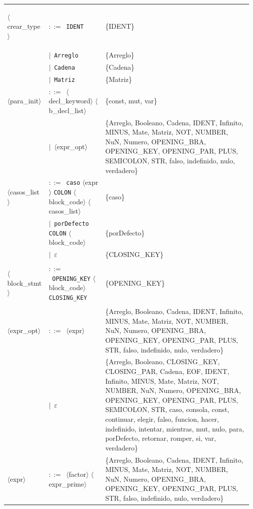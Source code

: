 \documentclass[10pt]{article}
\begin{document}
{\begin{longtable}{@{} p{2.0cm} p{6.9cm} p{6.9cm} @{}}
  \midrule
  \textcolor{ntcolor}{\parbox[t]{1.8cm}{\raggedright$\langle$crear\_\allowbreak{}type$\rangle$}} & $::=$~\texttt{IDENT} & \{IDENT\} \\
   & $\mid$~\texttt{Arreglo} & \{Arreglo\} \\
   & $\mid$~\texttt{Cadena} & \{Cadena\} \\
   & $\mid$~\texttt{Matriz} & \{Matriz\} \\
  \midrule
  \textcolor{ntcolor}{\parbox[t]{1.8cm}{\raggedright$\langle$para\_\allowbreak{}init$\rangle$}} & $::=$~$\langle$decl\_keyword$\rangle$ $\langle$b\_decl\_list$\rangle$ & \{const, mut, var\} \\
   & $\mid$~$\langle$expr\_opt$\rangle$ & \{Arreglo, Booleano, Cadena, IDENT, Infinito, MINUS, Mate, Matriz, NOT, NUMBER, NuN, Numero, OPENING\_BRA, OPENING\_KEY, OPENING\_PAR, PLUS, SEMICOLON, STR, falso, indefinido, nulo, verdadero\} \\
  \midrule
  \textcolor{ntcolor}{\parbox[t]{1.8cm}{\raggedright$\langle$casos\_\allowbreak{}list$\rangle$}} & $::=$~\texttt{caso} $\langle$expr$\rangle$ \texttt{COLON} $\langle$block\_code$\rangle$ $\langle$casos\_list$\rangle$ & \{caso\} \\
   & $\mid$~\texttt{porDefecto} \texttt{COLON} $\langle$block\_code$\rangle$ & \{porDefecto\} \\
   & $\mid$~$\varepsilon$ & \{CLOSING\_KEY\} \\
  \midrule
  \textcolor{ntcolor}{\parbox[t]{1.8cm}{\raggedright$\langle$block\_\allowbreak{}stmt$\rangle$}} & $::=$~\texttt{OPENING\_KEY} $\langle$block\_code$\rangle$ \texttt{CLOSING\_KEY} & \{OPENING\_KEY\} \\
  \midrule
  \textcolor{ntcolor}{\parbox[t]{1.8cm}{\raggedright$\langle$expr\_\allowbreak{}opt$\rangle$}} & $::=$~$\langle$expr$\rangle$ & \{Arreglo, Booleano, Cadena, IDENT, Infinito, MINUS, Mate, Matriz, NOT, NUMBER, NuN, Numero, OPENING\_BRA, OPENING\_KEY, OPENING\_PAR, PLUS, STR, falso, indefinido, nulo, verdadero\} \\
   & $\mid$~$\varepsilon$ & \{Arreglo, Booleano, CLOSING\_KEY, CLOSING\_PAR, Cadena, EOF, IDENT, Infinito, MINUS, Mate, Matriz, NOT, NUMBER, NuN, Numero, OPENING\_BRA, OPENING\_KEY, OPENING\_PAR, PLUS, SEMICOLON, STR, caso, consola, const, continuar, elegir, falso, funcion, hacer, indefinido, intentar, mientras, mut, nulo, para, porDefecto, retornar, romper, si, var, verdadero\} \\
  \midrule
  \textcolor{ntcolor}{\parbox[t]{1.8cm}{\raggedright$\langle$expr$\rangle$}} & $::=$~$\langle$factor$\rangle$ $\langle$expr\_prime$\rangle$ & \{Arreglo, Booleano, Cadena, IDENT, Infinito, MINUS, Mate, Matriz, NOT, NUMBER, NuN, Numero, OPENING\_BRA, OPENING\_KEY, OPENING\_PAR, PLUS, STR, falso, indefinido, nulo, verdadero\} \\

\end{longtable}}
\end{document}
